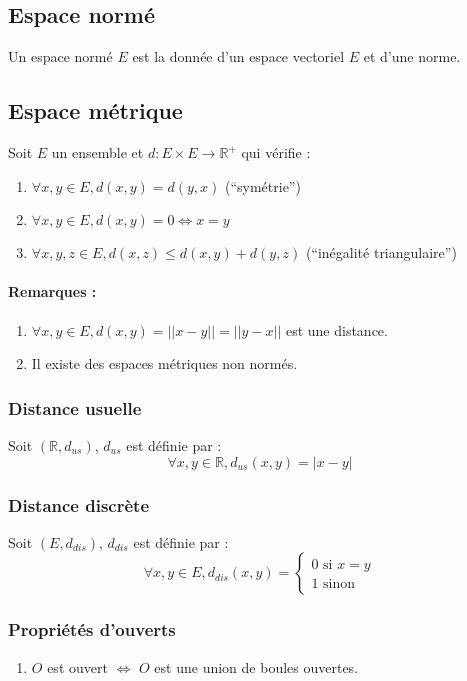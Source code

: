 \documentclass[a4paper,10pt]{article}
\newcommand{\ap}{ \to} %
\newcommand{\IR}{\mathbb{R}} %
\begin{document}
 \subsection{Espace norm\'e}
  Un espace norm\'e $E$ est la donn\'ee d'un espace vectoriel $E$ et d'une norme.

 \subsection{Espace m\'etrique}
  Soit $E$ un ensemble et $d: E \times E \ap \IR^+$ qui v\'erifie :
  \begin{enumerate}
    \item $\forall x, y \in E, d(x,y)=d(y,x)$ (``sym\'etrie'') 
    \item $\forall x, y \in E, d(x,y)=0 \iff x=y$ 
    \item $\forall x, y, z \in E, d(x,z) \le d(x,y) + d(y,z)$ (``in\'egalit\'e triangulaire'') 
  \end{enumerate}

  \paragraph{Remarques :}
   \begin{enumerate}
     \item $\forall x,y \in E, d(x,y) = ||x-y||=||y-x||$ est une distance.
     \item Il existe des espaces m\'etriques non norm\'es.
   \end{enumerate}

  \subsubsection{Distance usuelle}
   Soit $(\IR,d_{us})$, $d_{us}$ est d\'efinie par :
   $$\forall x,y \in \IR, d_{us}(x,y)=|x-y|$$
   
  \subsubsection{Distance discr\`ete}
   Soit $(E,d_{dis})$, $d_{dis}$ est d\'efinie par : 
   $$\forall x,y \in E, d_{dis}(x,y)=
   \begin{cases}
      0 \mbox{ si } x=y\\
      1 \mbox{ sinon}
   \end{cases}$$

  \subsubsection{Propri\'et\'es d'ouverts}
   \begin{enumerate}
     \item $O$ est ouvert $\iff$ $O$ est une union de boules ouvertes.
   \end{enumerate}
\end{document}
